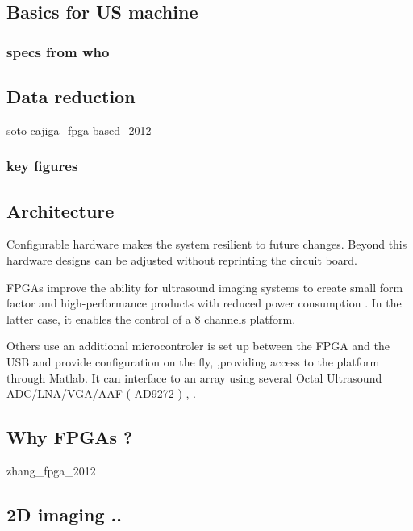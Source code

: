 \documentclass[conference]{IEEEtran}
\begin{document}
\subsection{Basics for US machine}

\subsubsection{specs from who}



\cite{kurjak_use_1986}


\subsection{Data reduction}

soto-cajiga_fpga-based_2012

\subsubsection{key figures}

\subsection{Architecture}



Configurable hardware makes the system resilient to future changes.
Beyond this hardware designs can be adjusted without reprinting the circuit board.

FPGAs improve the ability for ultrasound imaging systems to create small form factor and high-performance products with reduced power consumption \cite{dusa_low_2014}. In the latter case, it enables the control of a 8 channels platform.
  
Others use  an  additional microcontroler is set up between the FPGA and the USB and provide configuration on the fly, ,providing access to the platform through Matlab. It can interface to an array using several Octal Ultrasound ADC/LNA/VGA/AAF ( AD9272 ) \cite{raj_microcontroller_2017}, \cite{raj_8051_2016}.


\subsection{Why FPGAs ?}

zhang_fpga_2012


\subsection{2D imaging .. }
\end{document}
